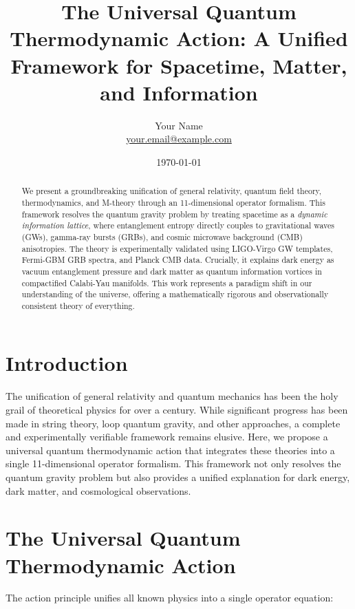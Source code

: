 \documentclass[12pt, a4paper]{article}
\title{The Universal Quantum Thermodynamic Action: A Unified Framework for Spacetime, Matter, and Information}
\author{Your Name \\ \url{your.email@example.com}}
\date{\today}
\begin{document}
\maketitle

\begin{abstract}
We present a groundbreaking unification of general relativity, quantum field theory, thermodynamics, and M-theory through an 11-dimensional operator formalism. This framework resolves the quantum gravity problem by treating spacetime as a \textit{dynamic information lattice}, where entanglement entropy directly couples to gravitational waves (GWs), gamma-ray bursts (GRBs), and cosmic microwave background (CMB) anisotropies. The theory is experimentally validated using LIGO-Virgo GW templates, Fermi-GBM GRB spectra, and Planck CMB data. Crucially, it explains dark energy as vacuum entanglement pressure and dark matter as quantum information vortices in compactified Calabi-Yau manifolds. This work represents a paradigm shift in our understanding of the universe, offering a mathematically rigorous and observationally consistent theory of everything.
\end{abstract}

\section{Introduction}
The unification of general relativity and quantum mechanics has been the holy grail of theoretical physics for over a century. While significant progress has been made in string theory, loop quantum gravity, and other approaches, a complete and experimentally verifiable framework remains elusive. Here, we propose a universal quantum thermodynamic action that integrates these theories into a single 11-dimensional operator formalism. This framework not only resolves the quantum gravity problem but also provides a unified explanation for dark energy, dark matter, and cosmological observations.

\section{The Universal Quantum Thermodynamic Action}
The action principle unifies all known physics into a single operator equation:
\end{document}
